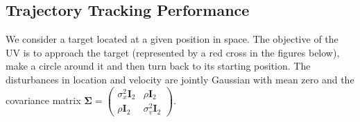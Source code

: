 \documentclass[10pt, journal, letterpaper]{IEEEtran}
\newcommand{\field}[1]{\ensuremath{\mathbb{#1}}}
\newcommand{\R}{\ensuremath{\field{R}}} %
\newcommand{\1}{\ensuremath{\mathbf{1}}} %
\newcommand{\vecbold}[1]{\ensuremath{\boldsymbol{#1}}}
\begin{document}
\subsection{Trajectory Tracking Performance}

We consider a target located at a given position in space.  The objective of the UV is to approach the target (represented by a red cross in the figures below), make a circle around it and then turn back to its starting position.  The disturbances in location and velocity are jointly Gaussian with mean zero and the covariance matrix $\vecbold{\Sigma} = \left(\begin{array}{cc}\sigma^2_x \vecbold{I}_2 & \rho \vecbold{I}_2 \\\rho \vecbold{I}_2 & \sigma^2_v \vecbold{I}_2\end{array}\right)$.

\end{document}
